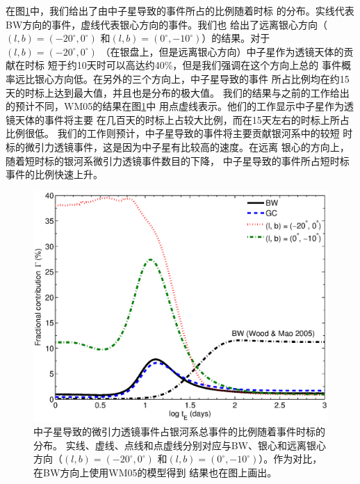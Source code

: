 在图\ref{ratio}中，我们给出了由中子星导致的事件所占的比例随着时标
的分布。实线代表BW方向的事件，虚线代表银心方向的事件。我们也
给出了远离银心方向（$(l,b)=(-20^{\circ},0^{\circ})$ 
和$(l,b)=(0^{\circ},-10^{\circ})$）的结果。对于$(l,b)=(-20^{\circ},0^{\circ})$
（在银盘上，但是远离银心方向）中子星作为透镜天体的贡献在时标
短于约10天时可以高达约40\%，但是我们强调在这个方向上总的
事件概率远比银心方向低。在另外的三个方向上，中子星导致的事件
所占比例均在约15天的时标上达到最大值，并且也是分布的极大值。
我们的结果与之前的工作给出的预计不同，WM05的结果在图\ref{ratio}中
用点虚线表示。他们的工作显示中子星作为透镜天体的事件将主要
在几百天的时标上占较大比例，而在15天左右的时标上所占比例很低。
我们的工作则预计，中子星导致的事件将主要贡献银河系中的较短
时标的微引力透镜事件，这是因为中子星有比较高的速度。在远离
银心的方向上，随着短时标的银河系微引力透镜事件数目的下降，
中子星导致的事件所占短时标事件的比例快速上升。

%
\begin{figure}
\begin{center}
  \includegraphics[width=4 in,trim=0 0 0 3cm]{ratio.eps}
%
\caption{中子星导致的微引力透镜事件占银河系总事件的比例随着事件时标的分布。
实线、虚线、点线和点虚线分别对应与BW、银心和远离银心方向（$(l,b)=(-20^{\circ},0^{\circ})$
和$(l,b)=(0^{\circ},-10^{\circ})$）。作为对比，在BW方向上使用WM05的模型得到
结果也在图上画出。}
\label{ratio}
\end{center}
\end{figure}
%

